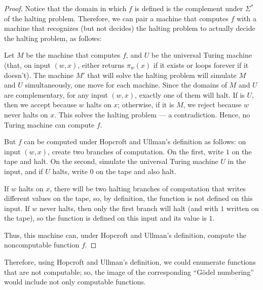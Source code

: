 \documentclass[12pt]{article}
\theoremstyle{definition}
\begin{document}
\begin{proof}
    Notice that the domain in which $f$ is defined
    is the complement under $\Sigma^*$ of the halting problem.
    Therefore,
    we can pair a machine that computes $f$
    with a machine that recognizes (but not decides) the halting problem
    to actually decide the halting problem,
    as follows:

    Let $M$ be the machine that computes $f$,
    and $U$ be the universal Turing machine
    (that, on input $(w, x)$,
    either returns $\pi_w(x)$ if it exists
    or loops forever if it doesn't).
    The machine $M'$ that will solve the halting problem
    will simulate $M$ and $U$ simultaneously,
    one move for each machine.
    Since the domains of $M$ and $U$ are complementary,
    for any input $(w, x)$, exactly one of them will halt.
    If is $U$, then we accept because $w$ halts on $x$;
    otherwise, if it is $M$, we reject because $w$ never halts on $x$.
    This solves the halting problem --- a contradiction.
    Hence, no Turing machine can compute $f$.

    But $f$ can be computed under Hopcroft and Ullman's definition as follows:
    on input $(w, x)$,
    create two branches of computation.
    On the first, write $1$ on the tape and halt.
    On the second, simulate the universal Turing machine $U$ in the input,
    and if $U$ halts, write $0$ on the tape and also halt.

    If $w$ halts on $x$,
    there will be two halting branches of computation
    that writes different values on the tape,
    so, by definition, the function is not defined on this input.
    If $w$ never halts,
    then only the first branch will halt
    (and with $1$ written on the tape),
    so the function is defined on this input and its value is $1$.

    Thus, this machine can, under Hopcroft and Ullman's definition,
    compute the noncomputable function $f$.
\end{proof}

Therefore,
using Hopcroft and Ullman's definition,
we could enumerate functions that are not computable;
so, the image of the corresponding ``Gödel numbering''
would include not only computable functions.
\end{document}
